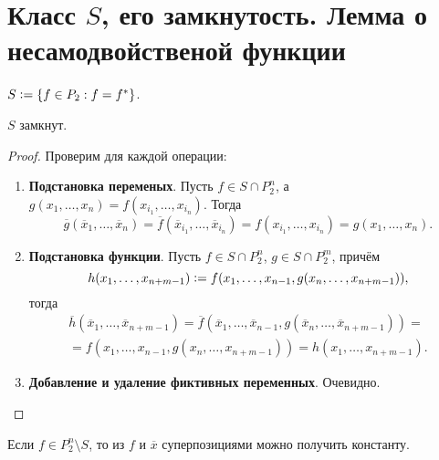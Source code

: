 \section{Класс $S$, его замкнутость. Лемма о несамодвойственой функции}

\begin{definition}
    $S \vcentcolon = \{f \in P_2 : f = f^\ast\}$.
\end{definition}

\begin{proposal}
    $S$ замкнут.
\end{proposal}

\begin{proof}
    Проверим для каждой операции:
    \begin{enumerate}
        \item \textbf{Подстановка переменых}. Пусть $f \in S \cap P_2^n$, а $g(x_1, \ldots, x_n) = f(x_{i_1}, \ldots, x_{i_n})$. Тогда
            \[
                \overline{g}(\overline{x}_1, \ldots, \overline{x}_n) = \overline{f}(\overline{x}_{i_1}, \ldots, \overline{x}_{i_n}) = f(x_{i_1}, \ldots, x_{i_n}) = g(x_1, \ldots, x_n).
            \]
        \item \textbf{Подстановка функции}. Пусть $f \in S \cap P_2^n$, $g \in S \cap P_2^m$, причём
            \[
                h(x_1, \ldots, x_{n + m - 1}) \vcentcolon = f(x_1, \ldots, x_{n - 1}, g(x_n, \ldots, x_{n + m - 1})),
            \]
            тогда
            \begin{multline*}
                \overline{h}(\overline{x}_1, \ldots, \overline{x}_{n + m - 1}) = \overline{f}(\overline{x}_1, \ldots, \overline{x}_{n - 1}, g(\overline{x}_n, \ldots, \overline{x}_{n + m - 1})) =\\ = f(x_1, \ldots, x_{n - 1}, g(x_n, \ldots, x_{n + m - 1})) = h(x_1, \ldots, x_{n + m - 1}).
            \end{multline*}
        \item \textbf{Добавление и удаление фиктивных переменных}. Очевидно.
    \end{enumerate}
\end{proof}

\begin{lemma}
    Если $f \in P_2^n \setminus S$, то из $f$ и $\overline{x}$ суперпозициями можно получить константу.
\end{lemma}

